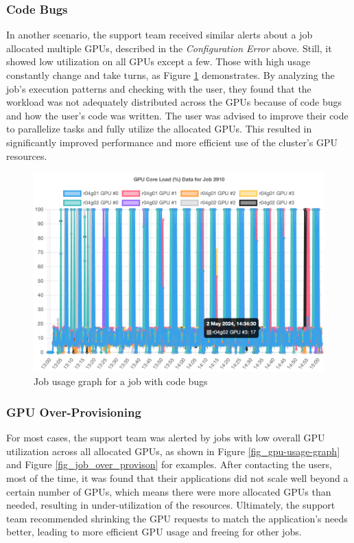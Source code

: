\subsubsection{Code Bugs}
In another scenario, the support team received similar alerts about a job allocated multiple GPUs, described in the \textit{Configuration Error} above. Still, it showed low utilization on all GPUs except a few. Those with high usage constantly change and take turns, as Figure \ref{fig_job_code_bugs} demonstrates. By analyzing the job's execution patterns and checking with the user, they found that the workload was not adequately distributed across the GPUs because of code bugs and how the user's code was written. The user was advised to improve their code to parallelize tasks and fully utilize the allocated GPUs. This resulted in significantly improved performance and more efficient use of the cluster's GPU resources.

\begin{figure}[H]
    \centering
    \includegraphics[width=1\textwidth]{figures/job-code-bugs.png}
    \caption{Job usage graph for a job with code bugs}
    \label{fig_job_code_bugs}
\end{figure}

\subsubsection{GPU Over-Provisioning}
For most cases, the support team was alerted by jobs with low overall GPU utilization across all allocated GPUs, as shown in Figure \ref{fig_gpu-usage-graph} and Figure \ref{fig_job_over_provison} for examples. After contacting the users, most of the time, it was found that their applications did not scale well beyond a certain number of GPUs, which means there were more allocated GPUs than needed, resulting in under-utilization of the resources. Ultimately, the support team recommended shrinking the GPU requests to match the application's needs better, leading to more efficient GPU usage and freeing for other jobs.


